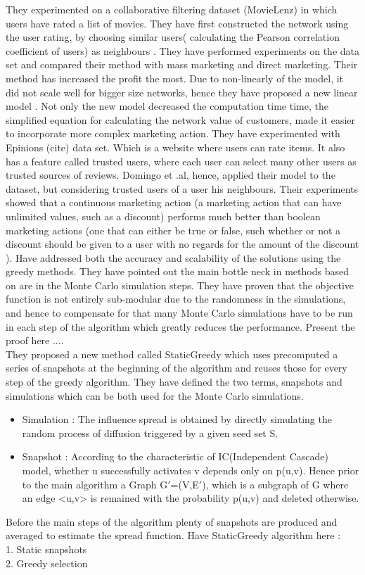 \documentclass[english]{tktltiki}
\begin{document}
They experimented on a collaborative filtering dataset (MovieLenz) in which users have rated a list of movies. They have first constructed the network using the user rating, by choosing similar users( calculating the Pearson correlation coefficient of users) as neighbours . They have performed experiments on the data set and compared their method with mass marketing and direct marketing. Their method has increased the profit the most. Due to non-linearly of the model, it did not scale well for bigger size networks, hence they have proposed a new linear model \cite{domingo02}. Not only the new model decreased the computation time time, the simplified equation for calculating the network value of customers, made it easier to incorporate more complex marketing action. They have experimented with Epinions (cite) data set. Which is a website where users can rate items. It also has a feature called trusted users, where each user can select many other users as trusted sources of reviews. Domingo et .al, hence, applied their model to the dataset, but considering trusted users of a user his neighbours. Their experiments showed that a continuous marketing action (a marketing action that can have unlimited values, such as a discount) performs much better than boolean marketing actions (one that can either be true or false, such whether or not a discount should be given to a user with no regards for the amount of the discount ). 
\cite{cheng13} Have addressed both the accuracy and scalability of the solutions using the greedy methods. They have pointed out the main bottle neck in methods based on \cite{kempe03} are in the Monte Carlo simulation steps. They have proven that the objective function is not entirely sub-modular due to the randomness in the simulations, and hence to compensate for that many Monte Carlo simulations have to be run in each step of the algorithm which greatly reduces the performance. Present the proof here ....\\
They proposed a new method called StaticGreedy which uses precomputed a series of snapshots at the beginning of the algorithm and reuses those for every step of the greedy algorithm.  They have defined the two terms, snapshots and simulations which can be both used for the Monte Carlo simulations. \\
\begin{itemize}
\item 
Simulation : The influence spread is obtained by directly simulating the random process of diffusion triggered by a given seed set S.
\item
Snapshot : According to the characteristic of IC(Independent Cascade) model, whether u successfully activates v depends only on p(u,v). Hence prior to the main algorithm a Graph G$'$=(V,E$'$), which is a subgraph of G where an edge <u,v> is remained with the probability p(u,v) and deleted otherwise. 
\end{itemize}
Before the main steps of the algorithm plenty of snapshots are produced and averaged to estimate the spread function. 
Have StaticGreedy algorithm here :\\
1. Static snapshots \\
2. Greedy selection \\
\end{document}
